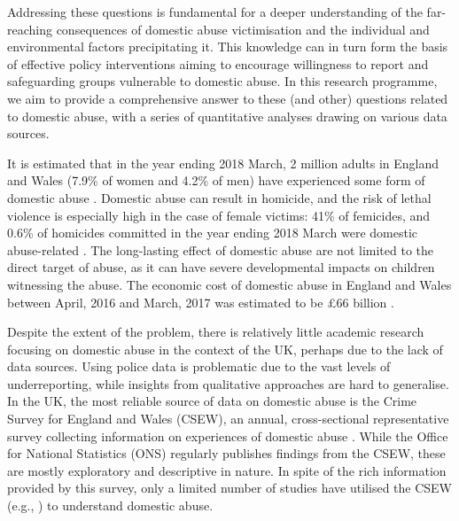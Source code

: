 \documentclass[11pt, a4paper]{article}
\begin{document}
Addressing these questions is fundamental for a deeper understanding of the far-reaching consequences of domestic abuse victimisation and the individual and environmental factors precipitating it. This knowledge can in turn form the basis of effective policy interventions aiming to encourage willingness to report and safeguarding groups vulnerable to domestic abuse. In this research programme, we aim to provide a comprehensive answer to these (and other) questions related to domestic abuse, with a series of quantitative analyses drawing on various data sources. 

It is estimated that in the year ending 2018 March, 2 million adults in England and Wales (7.9\% of women and 4.2\% of men) have experienced some form of domestic abuse \cite{ONS}. Domestic abuse can result in homicide, and the risk of lethal violence is especially high in the case of female victims: 41\% of femicides, and 0.6\% of homicides committed in the year ending 2018 March were domestic abuse-related \cite{homic}. The long-lasting effect of domestic abuse are not limited to the direct target of abuse, as it can have severe developmental impacts on children witnessing the abuse. The economic cost of domestic abuse in England and Wales between April, 2016 and March, 2017 was estimated to be \pounds 66 billion \cite{costs}. 

Despite the extent of the problem, there is relatively little academic research focusing on domestic abuse in the context of the UK, perhaps due to the lack of data sources. Using police data is problematic due to the vast levels of underreporting, while insights from qualitative approaches are hard to generalise. In the UK, the most reliable source of data on domestic abuse is the Crime Survey for England and Wales (CSEW), an annual, cross-sectional representative survey collecting information on experiences of domestic abuse \cite{OfficeforNationalStatistics2019}.  While the Office for National Statistics (ONS) regularly publishes findings from the CSEW, these are mostly exploratory and descriptive in nature. In spite of the rich information provided by this survey, only a limited number of studies have utilised the CSEW (e.g., ) to understand domestic abuse. 
\end{document}
